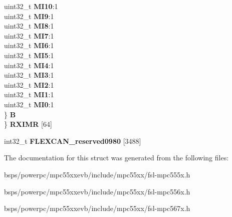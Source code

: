 \begin{DoxyCompactItemize}
\begin{tabbing}
\>\>uint32\_t {\bfseries MI10}:1\\
\>\>uint32\_t {\bfseries MI9}:1\\
\>\>uint32\_t {\bfseries MI8}:1\\
\>\>uint32\_t {\bfseries MI7}:1\\
\>\>uint32\_t {\bfseries MI6}:1\\
\>\>uint32\_t {\bfseries MI5}:1\\
\>\>uint32\_t {\bfseries MI4}:1\\
\>\>uint32\_t {\bfseries MI3}:1\\
\>\>uint32\_t {\bfseries MI2}:1\\
\>\>uint32\_t {\bfseries MI1}:1\\
\>\>uint32\_t {\bfseries MI0}:1\\
\>\} {\bfseries B}\\
\} {\bfseries RXIMR} \mbox{[}64\mbox{]}\\

\end{tabbing}\item 
\mbox{\label{structFLEXCAN2__tag_a5b63b9fd5d2b7ff92c5b397e49adfb26}} 
int32\+\_\+t {\bfseries F\+L\+E\+X\+C\+A\+N\+\_\+reserved0980} \mbox{[}3488\mbox{]}
\end{DoxyCompactItemize}


The documentation for this struct was generated from the following files\+:\begin{DoxyCompactItemize}
\item 
bsps/powerpc/mpc55xxevb/include/mpc55xx/fsl-\/mpc555x.\+h\item 
bsps/powerpc/mpc55xxevb/include/mpc55xx/fsl-\/mpc556x.\+h\item 
bsps/powerpc/mpc55xxevb/include/mpc55xx/fsl-\/mpc567x.\+h\end{DoxyCompactItemize}
